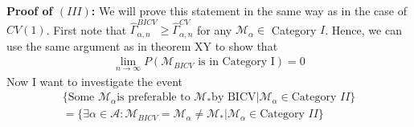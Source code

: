 \documentclass[Research_Module_ES.tex]{subfiles}
\begin{document}
\textbf{Proof of $(III)$:} 
We will prove this statement in the same way as in the case of $CV(1)$. 
First note that $\hat{\Gamma}_{\alpha,n}^{BICV} \ge \hat{\Gamma}_{\alpha,n}^{CV}$ for any $\mathcal{M}_\alpha \in $ Category $I$. Hence, we can use the same argument as in theorem XY to show that 
\begin{align*}
\lim_{n\to\infty} P(\mathcal{M}_{BICV}\textrm{ is in Category I})=0
\end{align*}
Now I want to investigate the event
\begin{align*}
\{\textrm{Some }\mathcal{M}_\alpha \textrm{is preferable to } \mathcal{M}_\ast \textrm{by BICV} | \mathcal{M}_\alpha \in \textrm{Category $II$}\}\\
= \{\exists \alpha \in \mathcal{A} :\mathcal{M}_{BICV}=\mathcal{M}_\alpha\neq \mathcal{M}_\ast | \mathcal{M}_\alpha \in \textrm{Category $II$}\}
\end{align*}
\end{document}
